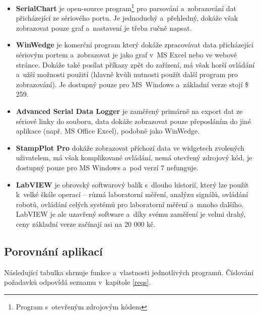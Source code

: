 \documentclass[12pt, a4paper, oneside]{article}
\begin{document}
\begin{itemize}
    \item {\bf SerialChart}\cite{serialchart} je open-source program\footnote{Program s~otevřeným zdrojovým kódem} pro parsování a~zobrazování dat přicházející ze sériového portu. Je jednoduchý a~přehledný, dokáže však zobrazovat pouze graf a~nastavení je třeba ručně napsat.
    \item {\bf WinWedge}\cite{winwedge} je komerční program který dokáže zpracovávat data přicházející sériovým portem a~zobrazovat je jako graf v~MS Excel nebo ve webové stránce. Dokáže také posílat příkazy zpět do zařízení, má však horší ovládání a~užší možnosti použití (hlavně kvůli nutnosti použít další program pro zobrazování). Je dostupný pouze pro MS~Windows a~základní verze stojí \$ 259.
    \item {\bf Advanced Serial Data Logger}\cite{serialdatalogger} je zaměřený primárně na export dat ze sériové linky do souboru, data dokáže zobrazovat pouze přeposláním do jiné aplikace (např. MS Office Excel), podobně jako WinWedge.
    \item {\bf StampPlot Pro}\cite{stamplot} dokáže zobrazovat příchozí data ve widgetech zvolených uživatelem, má však komplikované ovládání, nemá otevřený zdrojový kód, je dostupný pouze pro MS Windows a~pod verzí 7 nefunguje.
    \item {\bf LabVIEW}\cite{labview} je obrovský softwarový balík s~dlouho historií, který lze použít k~velké škále operací -- různá laboratorní měření, analýzu signálů, ovládání robotů, ovládání celých systémů pro laboratorní měření a~mnoho dalšího. LabVIEW je ale uzavřený software a~díky svému zaměření je velmi drahý, ceny základní verze začínají asi na 20 000 kč.
\end{itemize}

\newpage
\subsection{Porovnání aplikací}
Následující tabulka shrnuje funkce a~vlastnosti jednotlivých programů. Číslování požadavků odpovídá seznamu v~kapitole \ref{reqs}.

\vspace{5mm}
\end{document}
